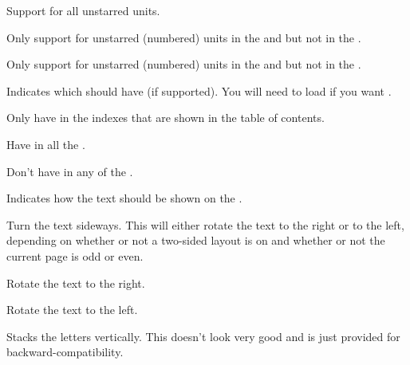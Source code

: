 \documentclass[fontsize=12pt]{scrbook}
\begin{document}

Support  for all unstarred units.


Only support  for unstarred (numbered) units in the 
 and  but not in the .


Only support  for unstarred (numbered) units in the 
 and  but not in the .


Indicates which  should have  (if supported).
You will need to load  if you want .


Only have  in the  indexes that are
shown in the table of contents.


Have  in all the .


Don't have  in any of the .


Indicates how the text should be shown on the .


Turn the text sideways. This will either rotate the text to the
right or to the left, depending on whether or not a two-sided layout
is on and whether or not the current page is odd or even.


Rotate the text to the right.


Rotate the text to the left.


Stacks the letters vertically. This doesn't look very good and is
just provided for backward-compatibility.

\end{document}
